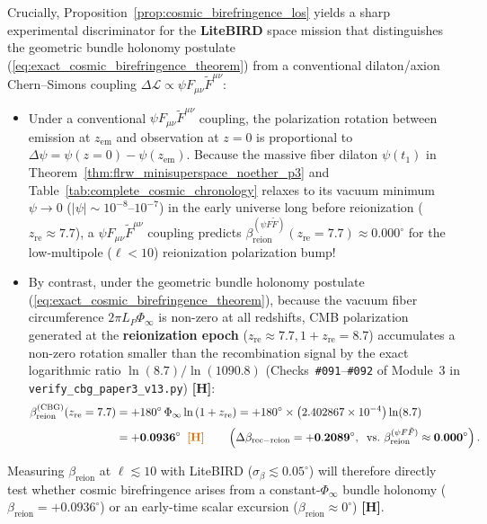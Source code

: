 \documentclass[11pt,a4paper]{article}
\newcommand{\catH}{\textbf{\textcolor{orange!85!black}{[H]}}}
\theoremstyle{plain}
\theoremstyle{definition}
\theoremstyle{remark}
\numberwithin{equation}{section}
\begin{document}
Crucially, Proposition~\ref{prop:cosmic_birefringence_los} yields a sharp experimental discriminator for the \textbf{LiteBIRD} space mission \cite{litebird2023} that distinguishes the geometric bundle holonomy postulate (\ref{eq:exact_cosmic_birefringence_theorem}) from a conventional dilaton/axion Chern--Simons coupling $\Delta\mathcal{L} \propto \psi F_{\mu\nu}\tilde{F}^{\mu\nu}$:
\begin{itemize}
  \item Under a conventional $\psi F_{\mu\nu}\tilde{F}^{\mu\nu}$ coupling, the polarization rotation between emission at $z_{\text{em}}$ and observation at $z = 0$ is proportional to $\Delta\psi = \psi(z=0) - \psi(z_{\text{em}})$. Because the massive fiber dilaton $\psi(t_1)$ in Theorem~\ref{thm:flrw_minisuperspace_noether_p3} and Table~\ref{tab:complete_cosmic_chronology} relaxes to its vacuum minimum $\psi \to 0$ ($\lvert\psi\rvert \sim 10^{-8}\text{--}10^{-7}$) in the early universe long before reionization ($z_{\text{re}} \approx 7.7$), a $\psi F_{\mu\nu}\tilde{F}^{\mu\nu}$ coupling predicts $\beta_{\text{reion}}^{(\psi F\tilde{F})}(z_{\text{re}} = 7.7) \approx \mathbf{0.000^\circ}$ for the low-multipole ($\ell < 10$) reionization polarization bump!
  \item By contrast, under the geometric bundle holonomy postulate (\ref{eq:exact_cosmic_birefringence_theorem}), because the vacuum fiber circumference $2\pi L_P\Phi_{\infty}$ is non-zero at all redshifts, CMB polarization generated at the \textbf{reionization epoch} ($z_{\text{re}} \approx 7.7, 1 + z_{\text{re}} = 8.7$) accumulates a non-zero rotation smaller than the recombination signal by the exact logarithmic ratio $\ln(8.7)/\ln(1090.8)$ (Checks~\texttt{\#091}--\texttt{\#092} of Module~3 in \allowbreak\texttt{verify\_cbg\_paper3\_v13.py}) \catH:
  \begin{align}
  \beta_{\text{reion}}^{\text{(CBG)}}(z_{\text{re}} = 7.7) &= +180^\circ\,\Phi_{\infty}\ln\left(1 + z_{\text{re}}\right) = +180^\circ \times \left(2.402867 \times 10^{-4}\right)\ln(8.7) \nonumber \\[3pt]
  &= \mathbf{+0.0936^\circ} \;\;\catH \qquad \left(\Delta\beta_{\text{rec}-\text{reion}} = \mathbf{+0.2089^\circ}, \;\; \text{vs.\ } \beta_{\text{reion}}^{(\psi F\tilde{F})} \approx \mathbf{0.000^\circ}\right).
  \label{eq:reionization_birefringence_prediction}
  \end{align}
\end{itemize}
Measuring $\beta_{\text{reion}}$ at $\ell \lesssim 10$ with LiteBIRD ($\sigma_\beta \lesssim 0.05^\circ$) will therefore directly test whether cosmic birefringence arises from a constant-$\Phi_{\infty}$ bundle holonomy ($\beta_{\text{reion}} = +0.0936^\circ$) or an early-time scalar excursion ($\beta_{\text{reion}} \approx 0^\circ$) \catH.
\end{document}
